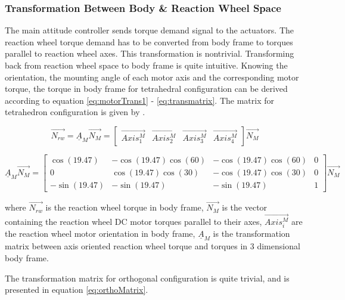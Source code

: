 
\subsubsection{Transformation Between Body \& Reaction Wheel Space}

The main attitude controller sends torque demand signal to the actuators. The reaction wheel torque demand has to be converted from body frame to torques parallel to reaction wheel axes. This transformation is nontrivial. Transforming back from reaction wheel space to body frame is quite intuitive. Knowing the orientation, the mounting angle of each motor axis and the corresponding motor torque, the torque in body frame for tetrahedral configuration can be derived according to equation \ref{eq:motorTrans1} - \ref{eq:transmatrix}. The matrix for tetrahedron configuration is given by \cite{reactionWheelConfigThesis}.

\begin{equation}
\label{eq:motorTrans1}
\vec{N_{rw}} = \underline{A}_{M} \vec{N_{M}} = \begin{bmatrix}
\vec{Axis^{M}_{1}}       & \vec{Axis^{M}_{2}}   & \vec{Axis^{M}_{3}}   & \vec{Axis^{M}_{4}} 
\end{bmatrix} \vec{N_{M}}
\end{equation}

\begin{equation}
\underline{A}_{M} \vec{N_{M}}  = 
\begin{bmatrix}
\cos(19.47)       & -\cos(19.47) \cos(60)  &  -\cos(19.47) \cos(60)  & 0 \\
0       & \cos(19.47) \cos(30)  &  -\cos(19.47) \cos(30)  & 0 \\
-\sin(19.47)       & -\sin(19.47)   &  -\sin(19.47)   & 1
\end{bmatrix} \vec{N_{M}}
\label{eq:transmatrix}
\end{equation}

where $\vec{N_{rw}}$ is the reaction wheel torque in body frame, $\vec{N_{M}}$ is the vector containing the reaction wheel DC motor torques parallel to their axes, $\vec{Axis^{M}_{i}}$ are the reaction wheel motor orientation in body frame, $\underline{A}_{M}$ is the transformation matrix between axis oriented reaction wheel torque and torques in 3 dimensional body frame.

The transformation matrix for orthogonal configuration is quite trivial, and is presented in equation \ref{eq:orthoMatrix}.

